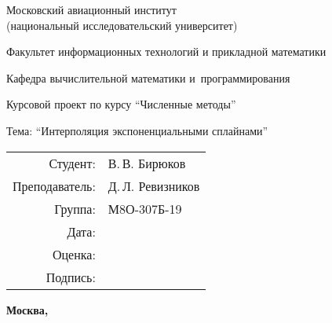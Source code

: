 \begin{titlepage}
\begin{center}
\bfseries

{\Large Московский авиационный институт\\ (национальный исследовательский университет)

}

\vspace{48pt}

{\large Факультет информационных технологий и прикладной математики
}

\vspace{36pt}

{\large Кафедра вычислительной математики и~программирования

}


\vspace{48pt}

Курсовой проект по курсу \enquote{Численные методы}

Тема: \enquote{Интерполяция экспоненциальными сплайнами}

\end{center}

\vspace{72pt}

\begin{flushright}
\begin{tabular}{rl}
Студент: & В.\,В. Бирюков \\
Преподаватель: & Д.\,Л. Ревизников \\
Группа: & М8О-307Б-19 \\
Дата: & \\
Оценка: & \\
Подпись: & \\
\end{tabular}
\end{flushright}

\vfill

\begin{center}
\bfseries
Москва, \the\year
\end{center}
\end{titlepage}

\pagebreak
